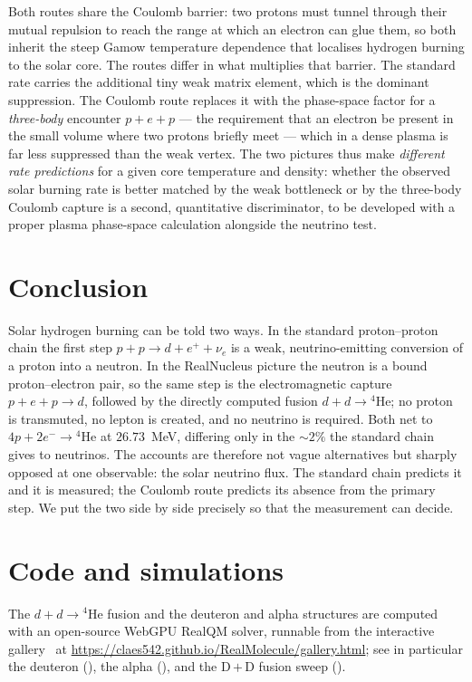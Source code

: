 \documentclass[11pt]{article}
\begin{document}
Both routes share the Coulomb barrier: two protons must tunnel through their mutual repulsion to reach
the range at which an electron can glue them, so both inherit the steep Gamow temperature dependence
that localises hydrogen burning to the solar core. The routes differ in what multiplies that barrier.
The standard rate carries the additional tiny weak matrix element, which is the dominant suppression.
The Coulomb route replaces it with the phase-space factor for a \emph{three-body} encounter
$p+e+p$ --- the requirement that an electron be present in the small volume where two protons briefly
meet --- which in a dense plasma is far less suppressed than the weak vertex. The two pictures thus
make \emph{different rate predictions} for a given core temperature and density: whether the observed
solar burning rate is better matched by the weak bottleneck or by the three-body Coulomb capture is a
second, quantitative discriminator, to be developed with a proper plasma phase-space calculation
alongside the neutrino test.

\section{Conclusion}

Solar hydrogen burning can be told two ways. In the standard proton--proton chain the first step
$p+p\to d+e^{+}+\nu_e$ is a weak, neutrino-emitting conversion of a proton into a neutron. In the
RealNucleus picture the neutron is a bound proton--electron pair, so the same step is the
electromagnetic capture $p+e+p\to d$, followed by the directly computed fusion $d+d\to{}^4\mathrm{He}$;
no proton is transmuted, no lepton is created, and no neutrino is required. Both net to
$4p+2e^-\to{}^4\mathrm{He}$ at $26.73$~MeV, differing only in the ${\sim}2\%$ the standard chain gives
to neutrinos. The accounts are therefore not vague alternatives but sharply opposed at one observable:
the solar neutrino flux. The standard chain predicts it and it is measured; the Coulomb route predicts
its absence from the primary step. We put the two side by side precisely so that the measurement can
decide.

\section*{Code and simulations}
\sloppy
The $d+d\to{}^4\mathrm{He}$ fusion and the deuteron and alpha structures are computed with an
open-source WebGPU RealQM solver, runnable from the interactive gallery~\cite{Gallery} at
\url{https://claes542.github.io/RealMolecule/gallery.html}; see in particular the deuteron
(), the alpha (), and the D\,$+$\,D fusion sweep
().
\fussy
\end{document}
